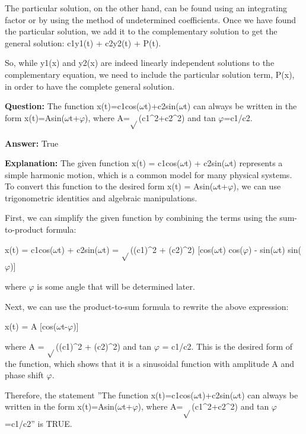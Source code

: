 \documentclass{article}
\begin{document}
The particular solution, on the other hand, can be found using an integrating factor or by using the method of undetermined coefficients. Once we have found the particular solution, we add it to the complementary solution to get the general solution: c1y1(t) + c2y2(t) + P(t).

So, while y1(x) and y2(x) are indeed linearly independent solutions to the complementary equation, we need to include the particular solution term, P(x), in order to have the complete general solution.
                
                \vspace{0.5cm} 
        
            
                \textbf {Question:} The function x(t)=c1cos(\ensuremath{\omega}t)+c2sin(\ensuremath{\omega}t) can always be written in the form x(t)=Asin(\ensuremath{\omega}t+\ensuremath{\varphi}), where A=\ensuremath{\sqrt{}}(c1{\textasciicircum}2+c2{\textasciicircum}2) and tan \ensuremath{\varphi}=c1/c2.
                
                \textbf{Answer:} True

                \textbf{Explanation:} The given function x(t) = c1cos(\ensuremath{\omega}t) + c2sin(\ensuremath{\omega}t) represents a simple harmonic motion, which is a common model for many physical systems. To convert this function to the desired form x(t) = Asin(\ensuremath{\omega}t+\ensuremath{\varphi}), we can use trigonometric identities and algebraic manipulations.

First, we can simplify the given function by combining the terms using the sum-to-product formula:

x(t) = c1cos(\ensuremath{\omega}t) + c2sin(\ensuremath{\omega}t)
= \ensuremath{\sqrt{}}((c1){\textasciicircum}2 + (c2){\textasciicircum}2) [cos(\ensuremath{\omega}t) cos(\ensuremath{\varphi}) - sin(\ensuremath{\omega}t) sin(\ensuremath{\varphi})]

where \ensuremath{\varphi} is some angle that will be determined later.

Next, we can use the product-to-sum formula to rewrite the above expression:

x(t) = A [cos(\ensuremath{\omega}t-\ensuremath{\varphi})]

where A = \ensuremath{\sqrt{}}((c1){\textasciicircum}2 + (c2){\textasciicircum}2) and tan \ensuremath{\varphi} = c1/c2. This is the desired form of the function, which shows that it is a sinusoidal function with amplitude A and phase shift \ensuremath{\varphi}.

Therefore, the statement ''The function x(t)=c1cos(\ensuremath{\omega}t)+c2sin(\ensuremath{\omega}t) can always be written in the form x(t)=Asin(\ensuremath{\omega}t+\ensuremath{\varphi}), where A=\ensuremath{\sqrt{}}(c1{\textasciicircum}2+c2{\textasciicircum}2) and tan \ensuremath{\varphi}=c1/c2'' is TRUE.
                
                \vspace{0.5cm} 
        
            
\end{document}
